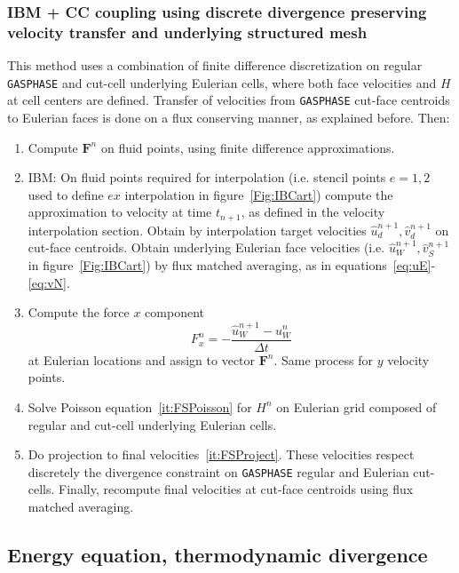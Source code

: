 \documentclass[12pt]{article}
\begin{document}
\subsubsection{IBM + CC coupling using discrete divergence preserving velocity transfer and underlying structured mesh}

This method uses a combination of finite difference discretization on regular \texttt{GASPHASE} and cut-cell underlying Eulerian cells, where both face velocities and $H$ at cell centers are defined. Transfer of velocities from \texttt{GASPHASE} cut-face centroids to Eulerian faces is done on a flux conserving manner, as explained before. Then:
%
\begin{enumerate}

  \item Compute $\mathbf{F}^{n}$ on fluid points, using finite difference approximations.

  \item IBM: On fluid points required for interpolation (i.e. stencil points $e=1,2$ used to define $ex$ interpolation in figure~\ref{Fig:IBCart}) compute the approximation to velocity at time $t_{n+1}$, as defined in the velocity interpolation section. Obtain by interpolation target velocities $\hat{u}_d^{n+1},\hat{v}_d^{n+1}$ on cut-face centroids. Obtain underlying Eulerian face velocities (i.e. $\hat{u}_W^{n+1},\hat{v}_S^{n+1}$ in figure~\ref{Fig:IBCart}) by flux matched averaging, as in equations~\eqref{eq:uE}-\eqref{eq:vN}.

  \item Compute the force $x$ component
  \begin{equation}
    F_x^n = -\frac{\hat{u}_{W}^{n+1}-u_W^n}{\Delta t}  %
  \end{equation}
   at Eulerian locations and assign to vector $\mathbf{F}^{n}$. Same process for $y$ velocity  points.

  \item Solve Poisson equation~\eqref{it:FSPoisson} for $H^{n}$ on Eulerian grid composed of regular and cut-cell underlying Eulerian cells.
  \item Do projection to final velocities~\eqref{it:FSProject}. These velocities respect discretely the divergence constraint on \texttt{GASPHASE} regular and Eulerian cut-cells. Finally, recompute final velocities at cut-face centroids using flux matched averaging.
\end{enumerate}
%


\subsection{Energy equation, thermodynamic divergence}
\end{document}
